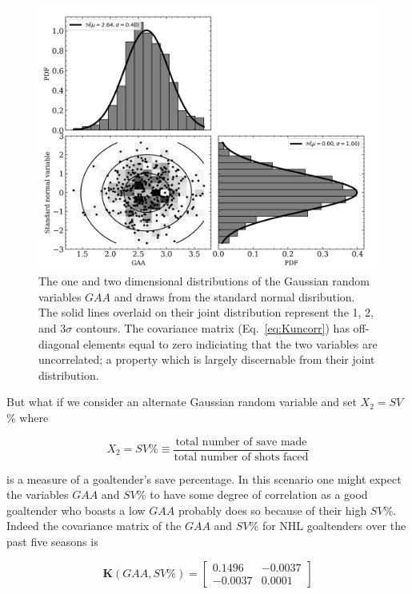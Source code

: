 \begin{figure}
  \centering
  \includegraphics[width=.9\textwidth]{figures/uncorr_2d.png}
  \caption{The one and two dimensional distributions of the Gaussian random
    variables $GAA$ and draws from the standard normal disribution. The solid
    lines overlaid on their joint distribution represent the 1, 2, and 3$\sigma$
    contours. The covariance matrix (Eq.~\ref{eq:Kuncorr})  has off-diagonal
    elements equal to zero indiciating that the two variables are uncorrelated;
    a property which is largely discernable from their joint distribution.}
  \label{fig:uncorr2d}
\end{figure}

But what if we consider an alternate Gaussian random variable and set
$X_2 = SV$\% where

\begin{equation}
  X_2 = SV\% \equiv \frac{\text{total number of save made}}{\text{total number of shots faced}}
\end{equation}

\noindent is a measure of a goaltender's save percentage. In this scenario one
might expect the variables $GAA$ and $SV$\% to have some degree of correlation
as a good goaltender who boasts a low $GAA$ probably does so because of their
high $SV$\%. Indeed the covariance matrix of the $GAA$ and $SV$\% for NHL
goaltenders over the past five seasons is

\begin{equation}
  \mathbf{K}(GAA,SV\%) =
  \begin{bmatrix}
    0.1496 & -0.0037 \\
    -0.0037 & 0.0001
  \end{bmatrix}
\end{equation}

